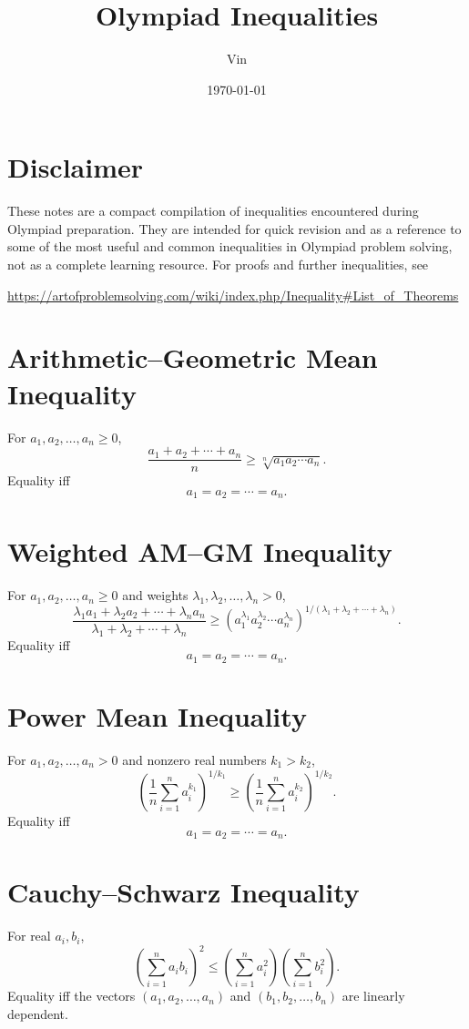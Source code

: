 \documentclass[11pt]{article}
\title{Olympiad Inequalities}
\author{Vin}
\date{\today}
\begin{document}
\maketitle
\section*{Disclaimer}
These notes are a compact compilation of inequalities encountered during Olympiad preparation. They are intended for quick revision and as a reference to some of the most useful and common inequalities in Olympiad problem solving, not as a complete learning resource. For proofs and further inequalities, see
\begin{center}
    \url{https://artofproblemsolving.com/wiki/index.php/Inequality#List_of_Theorems}
\end{center}

\section*{Arithmetic--Geometric Mean Inequality}
For $a_1,a_2,\ldots,a_n\geq 0$,
\[
    \frac{a_1+a_2+\cdots+a_n}{n}
    \geq
    \sqrt[n]{a_1a_2\cdots a_n}.
\]
Equality iff
\[
    a_1=a_2=\cdots=a_n.
\]

\section*{Weighted AM--GM Inequality}
For $a_1,a_2,\ldots,a_n\geq 0$ and weights $\lambda_1,\lambda_2,\ldots,\lambda_n>0$,
\[
    \frac{\lambda_1a_1+\lambda_2a_2+\cdots+\lambda_na_n}{\lambda_1+\lambda_2+\cdots+\lambda_n}
    \geq
    \left(a_1^{\lambda_1}a_2^{\lambda_2}\cdots a_n^{\lambda_n}\right)^{1/(\lambda_1+\lambda_2+\cdots+\lambda_n)}.
\]
Equality iff
\[
    a_1=a_2=\cdots=a_n.
\]

\section*{Power Mean Inequality}
For $a_1,a_2,\ldots,a_n>0$ and nonzero real numbers $k_1>k_2$,
\[
    \left(\frac{1}{n}\sum_{i=1}^n a_i^{k_1}\right)^{1/k_1}
    \geq
    \left(\frac{1}{n}\sum_{i=1}^n a_i^{k_2}\right)^{1/k_2}.
\]
Equality iff
\[
    a_1=a_2=\cdots=a_n.
\]

\section*{Cauchy--Schwarz Inequality}
For real $a_i,b_i$,
\[
    \left(\sum_{i=1}^n a_ib_i\right)^2
    \leq
    \left(\sum_{i=1}^n a_i^2\right)
    \left(\sum_{i=1}^n b_i^2\right).
\]
Equality iff the vectors $(a_1,a_2,\ldots,a_n)$ and $(b_1,b_2,\ldots,b_n)$ are linearly dependent.
\end{document}
